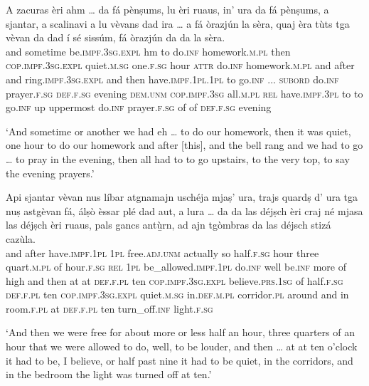 \begin{linenumbers}
\gll A zacuras èri ahm …  da fá pènṣums, lu èri ruaus, in’ ura da  fá  pènṣums, a  sjantar, a scalinavi a  lu vèvans  dad ira  …  a  fá  òrazjún la sèra, quaj èra tùts tga vèvan da dad í sé sissúm, fá  òrazjún   da da la sèra.\\
 and sometime be.\textsc{impf.3sg.expl} hm {} to do.\textsc{inf} homework.\textsc{m.pl} then \textsc{cop.impf.3sg.expl} quiet.\textsc{m.sg} one.\textsc{f.sg} hour \textsc{attr} do.\textsc{inf} homework.\textsc{m.pl} and after and   ring.\textsc{impf.3sg.expl} and then have.\textsc{impf.1pl.1pl} to go.\textsc{inf} ... \textsc{subord} do.\textsc{inf} prayer.\textsc{f.sg} \textsc{def.f.sg} evening \textsc{dem.unm} \textsc{cop.impf.3sg} all.\textsc{m.pl} \textsc{rel} have.\textsc{impf.3pl} to to go.\textsc{inf} up uppermost do.\textsc{inf} prayer.\textsc{f.sg} of of \textsc{def.f.sg} evening \\
\end{linenumbers}
\medskip
\glt `And sometime or another we had eh … to do our homework, then it was quiet, one hour to do our homework and after [this], and the bell rang and we had to go … to pray in the evening, then all had to to go upstairs, to the very top, to say the evening prayers.'
\medskip

\begin{linenumbers}
\gll    Api sjantar vèvan nus líbar atgnamajn uschéja mjaṣ’ ura, trajs quardṣ d’ ura tga nuṣ astgèvan fá, álṣò èssar plé dad aut, a lura … da da las déjṣch èri craj né mjasa las déjṣch èri ruaus, pals gancs antù̱rn, ad ajn tgòmbras da las déjsch stizá cazùla.\\
and after have.\textsc{impf.1pl} \textsc{1pl} free.\textsc{adj.unm} actually so half.\textsc{f.sg} hour three quart.\textsc{m.pl} of hour.\textsc{f.sg} \textsc{rel} \textsc{1pl} be\_allowed.\textsc{impf.1pl} do.\textsc{inf} well be.\textsc{inf} more of high and then {} at at \textsc{def.f.pl} ten \textsc{cop.impf.3sg.expl} believe.\textsc{prs.1sg} of  half.\textsc{f.sg} \textsc{def.f.pl} ten \textsc{cop.impf.3sg.expl} quiet.\textsc{m.sg} in.\textsc{def.m.pl} corridor.\textsc{pl} around and in room.\textsc{f.pl} at \textsc{def.f.pl} ten turn\_off.\textsc{inf} light.\textsc{f.sg}\\
\end{linenumbers}
\medskip
\glt `And then we were free for about more or less half an hour, three quarters of an hour that we were allowed to do, well, to be louder, and then … at at ten o’clock it had to be, I believe, or half past nine it had to be quiet, in the corridors, and in the bedroom the light was turned off at ten.'
\medskip

